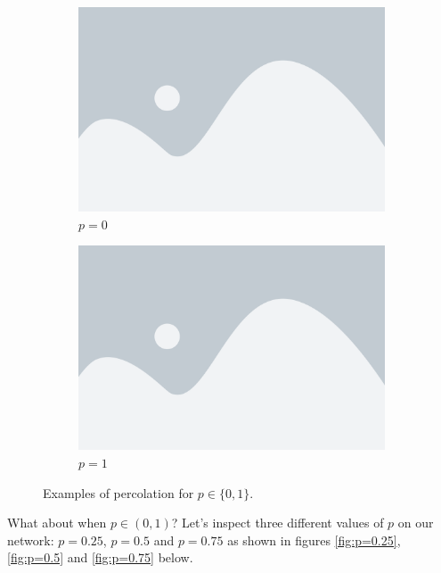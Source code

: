 \begin{figure}[h!]
  \centering
  \begin{subfigure}[b]{0.4\textwidth}
    \centering
    \includegraphics[width=\textwidth]{placeholder}
    \caption{$p=0$}
    \label{fig:p=0}
  \end{subfigure}
  \hfill
  \begin{subfigure}[b]{0.4\textwidth}
    \centering
    \includegraphics[width=\textwidth]{placeholder}
    \caption{$p=1$}
    \label{fig:p=1}
  \end{subfigure}
  \caption{Examples of percolation for $p\in\{0, 1\}$.}
  \label{fig:probability extrema}
\end{figure}

What about when $p\in(0,1)$? Let's inspect three different values of $p$ on our network: $p=0.25$, $p=0.5$ and $p=0.75$ as shown in figures \ref{fig:p=0.25}, \ref{fig:p=0.5} and
\ref{fig:p=0.75} below.

